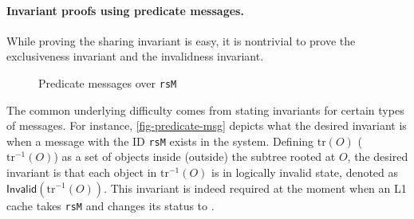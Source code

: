 \documentclass[sigplan,10pt,review,anonymous,screen]{acmart}\settopmatter{printfolios=true,printccs=false,printacmref=false}
\def\slstinline{\lstinline[basicstyle=\ttfamily\small]}
\begin{document}
\paragraph{Invariant proofs using predicate messages.}


\newcommand{\subtree}[1]{\ensuremath{\textrm{tr}(#1)}}
\newcommand{\subtreec}[1]{\ensuremath{\textrm{tr}^{-1}(#1)}}
\newcommand{\objsinv}[1]{\ensuremath{\textsf{Invalid}(#1)}}

While proving the sharing invariant is easy, it is nontrivial to prove the exclusiveness invariant and the invalidness invariant.

\begin{figure}[h]
  \centering
  \caption{Predicate messages over \slstinline{rsM}}
  \label{fig-predicate-msg}
\end{figure}

The common underlying difficulty comes from stating invariants for certain types of messages.
For instance, \autoref{fig-predicate-msg} depicts what the desired invariant is when a message with the ID \slstinline{rsM} exists in the system.
Defining $\subtree{O}$ ($\subtreec{O}$) as a set of objects inside (outside) the subtree rooted at $O$, the desired invariant is that each object in $\subtreec{O}$ is in logically invalid state, denoted as $\objsinv{\subtreec{O}}$.
This invariant is indeed required at the moment when an L1 cache takes \slstinline{rsM} and changes its status to \stM{}.
\end{document}
